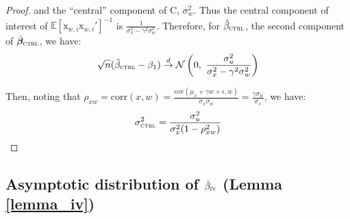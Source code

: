 \documentclass[usletter, 12pt]{article}
\begin{document}
\begin{proof}
				and the ``central'' component of C, $\sigma_{w}^{2}$. Thus the central component of interest of $\mathbb{E}[\text{x}_{w, i}\text{x}_{w, i}']^{-1}$ is $\frac{1}{\sigma_{x}^{2} - \gamma^{2}\sigma_{w}^{2}}$. Therefore, for $\hat{\beta}_{\textsc{ctrl}}$, the second component of $\hat{\bm{\beta}}_{\textsc{ctrl}}$, we have:
				\begin{equation}
					\sqrt{n}(\hat{\beta}_{\textsc{ctrl}} - \beta_1) \overset{d}{\to}
							 \mathcal{N}\left( 0 , \ \dfrac{\sigma_{u}^{2}}{\sigma_{x}^{2} - \gamma^{2}\sigma_{w}^{2}} \right) 
				\end{equation}
				
				Then, noting that $\rho_{xw} =  \text{corr}(x, w) = \frac{ \text{cov}(\mu_{x} + \gamma w + \epsilon, w)}{\sigma_{x}\sigma_{w}} = \frac{\gamma\sigma_{w}}{\sigma_{x}}$, we have:
				\[
					\sigma_{\textsc{ctrl}}^{2} = \dfrac{\sigma_{u}^{2}}{\sigma_{x}^{2}(1 - \rho_{xw}^{2})}
				\]
				\vspace{-0.5cm}
				\end{proof}
	

\subsection{Asymptotic distribution of $\hat{\beta}_{\textsc{iv}}$ (Lemma \ref{lemma_iv})}
	
\end{document}
